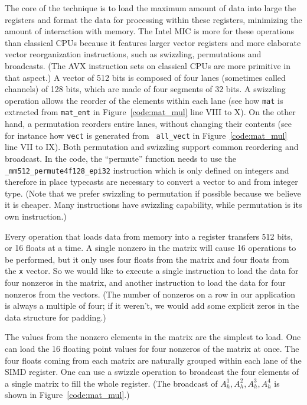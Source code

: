 \documentclass{sig-alternate}
\def\ee#1{{#1}}
\begin{document}
\ee{The core of the technique is to load the maximum amount of data
  into large the registers and format the data for processing within these
  registers, minimizing the amount of interaction with memory. 
  The Intel MIC is more for these operations than classical
  CPUs because it features larger vector registers and more elaborate
  vector reorganization instructions, such as swizzling,
  permutations and broadcasts. (The AVX instruction sets on classical
  CPUs are more primitive in that aspect.)} A vector of 512 bits is
composed of four lanes (sometimes called channels) of 128 bits, which
are made of four segments of 32 bits. A swizzling operation allows the
reorder of the elements within each lane (see how {\tt mat} is
extracted from {\tt mat\_ent} in Figure~\ref{code:mat_mul} line VIII to X). On the
other hand, a permutation reorders entire lanes, without changing
their contents (see for instance how {\tt vect} is generated from {\tt
  all\_vect} in Figure~\ref{code:mat_mul} line VII to IX).  Both permutation and
swizzling support common reordering and broadcast. In the code, the
``permute'' function needs to use the {\tt
  \_mm512\_permute4f128\_epi32} instruction which is only defined on
integers and therefore in place typecasts are necessary to convert a
vector to and from integer type.  (Note that we prefer swizzling to
permutation if possible because we believe it is cheaper. Many
instructions have swizzling capability, while permutation is its own
instruction.)

Every operation that loads data from memory into a register
transfers 512 bits, or 16 floats at a time. A single nonzero
in the matrix will cause 16 operations to be performed, but it only
uses four floats from the matrix and four floats from the {\tt x} vector. So
we would like to execute a single instruction to load the data for four 
nonzeros in the matrix, and another instruction to load the data for
four nonzeros from the vectors.  
(The number of nonzeros on a row in our application is
always a multiple of four; if it weren't, we would add some explicit
zeros in the data structure for padding.)

The values from the nonzero elements in the matrix are the simplest to
load. One can load the 16 floating point values for four nonzeros of
the matrix at once. The four floats coming from each matrix are
naturally grouped within each lane of the SIMD register. One can use a
swizzle operation to broadcast the four elements of a single matrix to
fill the whole register. (The broadcast of $A_h^1,A_h^2,A_h^3,A_h^4$ is
shown in Figure~\ref{code:mat_mul}.)
\end{document}
